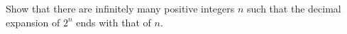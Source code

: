 Show that there are infinitely many positive integers $n$ such that the decimal expansion of $2^n$ ends with that of $n$.
